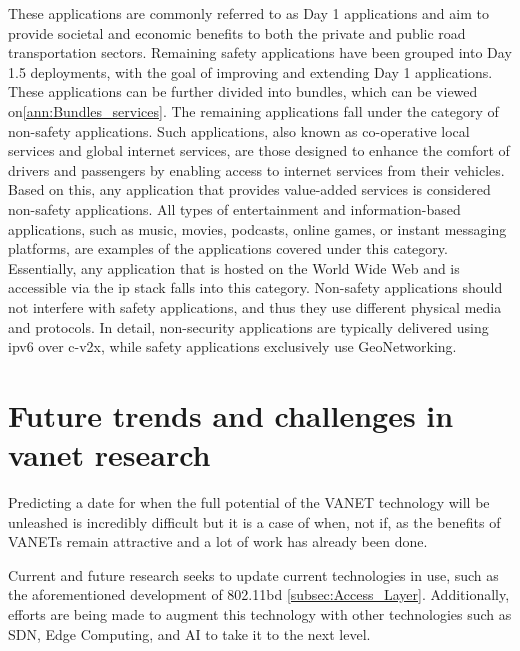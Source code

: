 These applications are commonly referred to as Day 1 applications and aim to provide societal and economic benefits to both the private and public road transportation sectors. Remaining safety applications have been grouped into Day 1.5 deployments, with the goal of improving and extending Day 1 applications. These applications can be further divided into bundles, which can be viewed on\ref{ann:Bundles_services}.
The remaining applications fall under the category of non-safety applications. Such applications, also known as co-operative local services and global internet services, are those designed to enhance the comfort of drivers and passengers by enabling access to internet services from their vehicles\cite{al-sultan_comprehensive_2014}. Based on this, any application that provides value-added services is considered non-safety applications\cite{toor_vehicle_2008}.
All types of entertainment and information-based applications, such as music, movies, podcasts, online games, or instant messaging platforms, are examples of the applications covered under this category. Essentially, any application that is hosted on the World Wide Web and is accessible via the \gls{ip} stack falls into this category.
Non-safety applications should not interfere with safety applications, and thus they use different physical media and protocols\cite{jakubiak_state_2008}. In detail, non-security applications are typically delivered using \gls{ipv6} over \gls{c-v2x}, while safety applications exclusively use GeoNetworking.


\section[Future trends and challenges in VANET research]{Future trends and challenges in \gls{vanet} research}
\label{sec:vanet_future}

Predicting a date for when the full potential of the VANET technology will be unleashed is incredibly difficult but it is a case of when, not if, as the benefits of VANETs remain attractive and a lot of work has already been done. 

Current and future research seeks to update current technologies in use, such as the aforementioned development of 802.11bd \ref{subsec:Access_Layer}. Additionally, efforts are being made to augment this technology with other technologies such as SDN, Edge Computing, and AI to take it to the next level\cite{mahi_review_2022}.

